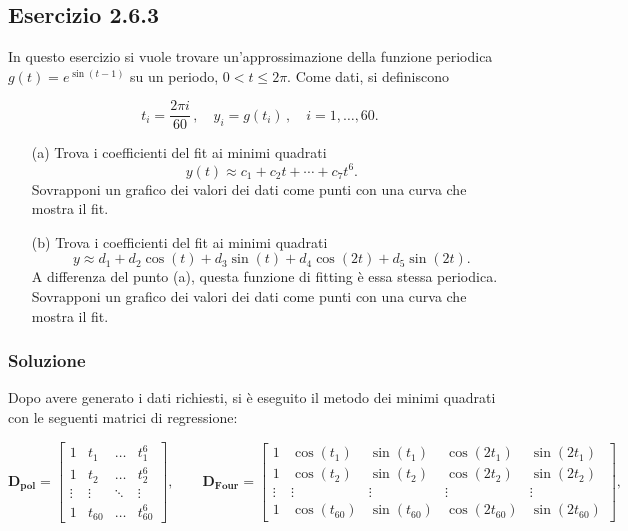 \documentclass[letterpaper, 12pt]{article}
\numberwithin{equation}{section}    %
\begin{document}
\subsection{Esercizio 2.6.3}
In questo esercizio si vuole trovare un'approssimazione della funzione periodica $g(t)=e^{\sin(t-1)}$ su un 
periodo, $0 < t \le 2\pi$. Come dati, si definiscono

\begin{equation*}
    t_i = \frac{2\pi i}{60}\,,
    \quad  
    y_i = g(t_i)\,,
    \quad i=1,\ldots,60.
\end{equation*}

\begin{enumerate}
\item [(a)] Trova i coefficienti del fit ai minimi quadrati    
    \begin{equation}
        \label{eq:fit_pol}    
        y(t) \approx c_1 + c_2 t + \cdots + c_7 t^6.
    \end{equation}        
Sovrapponi un grafico dei valori dei dati come punti con una curva che mostra il fit. \\
\item[(b)] Trova i coefficienti del fit ai minimi quadrati
    \begin{equation}
    \label{eq:fit_fourier}
        y \approx d_1 + d_2\cos(t) + d_3\sin(t) + d_4\cos(2t) + d_5\sin(2t).
    \end{equation}
A differenza del punto (a), questa funzione di fitting è essa stessa periodica. 
Sovrapponi un grafico dei valori dei dati come punti con una curva che mostra il fit.
\end{enumerate}

\subsubsection{Soluzione}
Dopo avere generato i dati richiesti, si è eseguito il metodo dei minimi quadrati con le seguenti 
matrici di regressione:

\begin{equation*}
    \mathbf{D_{pol}} = \begin{bmatrix}
        1 & t_1 & \hdots & t_1^6 \\
        1 & t_2 & \hdots & t_2^6 \\
        \vdots & \vdots & \ddots& \vdots \\
        1 & t_{60} & \hdots & t_{60}^6
    \end{bmatrix},
    \qquad
    \mathbf{D_{Four}} = \begin{bmatrix}
        1 & \cos(t_1) & \sin(t_1) & \cos(2t_1) & \sin(2t_1) \\
        1 & \cos(t_2) & \sin(t_2) & \cos(2t_2) & \sin(2t_2) \\
        \vdots & \vdots & \vdots & \vdots & \vdots \\
        1 & \cos(t_{60}) & \sin(t_{60}) & \cos(2t_{60}) & \sin(2t_{60})
    \end{bmatrix},
\end{equation*}
\end{document}
